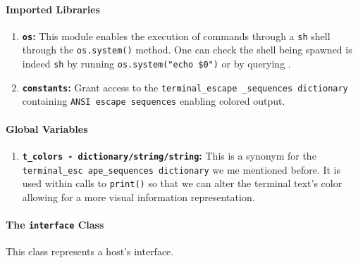    \paragraph{Imported Libraries}
        \begin{enumerate}
            \item \textbf{\texttt{os}:} This module enables the execution of commands through a \texttt{sh} shell through the \texttt{os.system()} method. One can check the shell being spawned is indeed \texttt{sh} by running \texttt{\allowbreak os.system("echo \$0")} or by querying \cite{bib:man-system}.
            \item \textbf{\texttt{constants}:} Grant access to the \texttt{\allowbreak terminal\_escape \_sequences dictionary} containing \texttt{ANSI escape sequences} enabling colored output.
        \end{enumerate}

    \paragraph{Global Variables}
        \begin{enumerate}
            \item \textbf{\texttt{\allowbreak t\_colors - dictionary/string/string}:} This is a synonym for the \texttt{\allowbreak terminal\_esc ape\_sequences dictionary} we me mentioned before. It is used within calls to \texttt{print()} so that we can alter the terminal text's color allowing for a more visual information representation.
        \end{enumerate}

    \paragraph{The \texttt{interface} Class}
        This class represents a host's interface.

